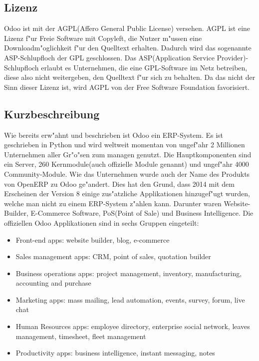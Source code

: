 \subsection{Lizenz}
Odoo ist mit der AGPL(Affero General Public License) versehen. AGPL ist eine Lizenz f"ur Freie Software mit Copyleft, die Nutzer m"ussen eine Downloadm"oglichkeit f"ur den Quelltext erhalten. Dadurch wird das sogenannte ASP-Schlupfloch der GPL geschlossen. Das ASP(Application Service Provider)-Schlupfloch erlaubt es Unternehmen, die eine GPL-Software im Netz betreiben, diese also nicht weitergeben, den Quelltext f"ur sich zu behalten. Da das nicht der Sinn dieser Lizenz ist, wird AGPL von der Free Software Foundation favorisiert.


\subsection{Kurzbeschreibung}
Wie bereits erw"ahnt und beschrieben ist Odoo ein ERP-System. Es ist geschrieben in Python und wird weltweit momentan von ungef"ahr 2 Millionen Unternehmen aller Gr"o"sen zum managen genutzt.
Die Hauptkomponenten sind ein Server, 260 Kernmodule(auch offizielle Module genannt) und ungef"ahr 4000 Community-Module.
Wie das Unternehmen wurde auch der Name des Produkts von OpenERP zu Odoo ge"andert. Dies hat den Grund, dass 2014 mit dem Erscheinen der Version 8 einige zus"atzliche Applikationen hinzugef"ugt wurden, welche man nicht zu einem ERP-System z"ahlen kann. Darunter waren Website-Builder, E-Commerce Software, PoS(Point of Sale) und Business Intelligence.
Die offiziellen Odoo Applikationen sind in sechs Gruppen eingeteilt:

\begin{itemize}
	\item Front-end apps: website builder, blog, e-commerce
	\item Sales management apps: CRM, point of sales, quotation builder
	\item Business operations apps: project management, inventory, manufacturing, accounting and purchase
	\item Marketing apps: mass mailing, lead automation, events, survey, forum, live chat
	\item Human Resources apps: employee directory, enterprise social network, leaves management, timesheet, fleet management
	\item Productivity apps: business intelligence, instant messaging, notes
\end{itemize}

